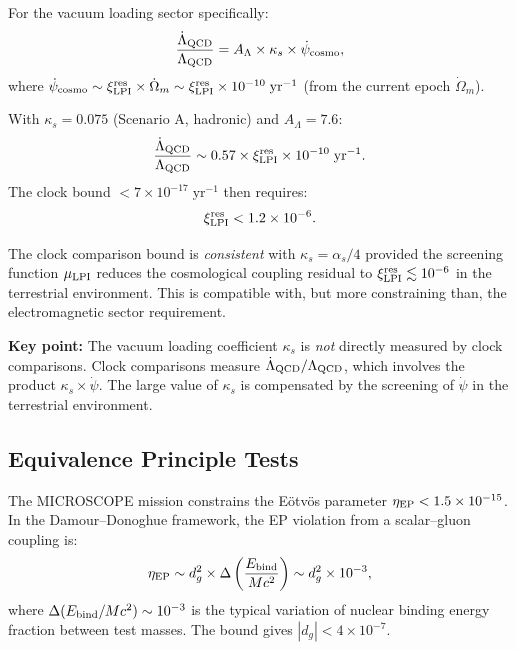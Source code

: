 \documentclass[11pt,letterpaper]{article}
\theoremstyle{definition}
\begin{document}
For the vacuum loading sector specifically:
\begin{equation}
\frac{\dot{\Lambda}_{\rm QCD}}{\Lambda_{\rm QCD}}
= A_\Lambda \times \kappa_s \times \dot{\psi}_{\rm cosmo},
\end{equation}
where $\dot{\psi}_{\rm cosmo} \sim \xi_{\rm LPI}^{\rm res} \times
\dot{\Omega}_m \sim \xi_{\rm LPI}^{\rm res} \times 10^{-10}\;
\mathrm{yr}^{-1}$ (from the current epoch $\dot{\Omega}_m$).

With $\kappa_s = 0.075$ (Scenario A, hadronic) and $A_\Lambda = 7.6$:
\begin{equation}
\frac{\dot{\Lambda}_{\rm QCD}}{\Lambda_{\rm QCD}}
\sim 0.57 \times \xi_{\rm LPI}^{\rm res} \times 10^{-10}\;
\mathrm{yr}^{-1}.
\end{equation}
The clock bound $< 7 \times 10^{-17}\;\mathrm{yr}^{-1}$ then requires:
\begin{equation}
\xi_{\rm LPI}^{\rm res} < 1.2 \times 10^{-6}.
\end{equation}

\begin{tcolorbox}[colback=yellow!5!white, colframe=yellow!50!black,
title=Experimental Bound Assessment]
The clock comparison bound is \emph{consistent} with
$\kappa_s = \alpha_s/4$ provided the screening function
$\mu_{\rm LPI}$ reduces the cosmological coupling residual to
$\xi_{\rm LPI}^{\rm res} \lesssim 10^{-6}$ in the terrestrial
environment.  This is compatible with, but more constraining than,
the electromagnetic sector requirement.

\textbf{Key point:} The vacuum loading coefficient $\kappa_s$ is
\emph{not} directly measured by clock comparisons.  Clock comparisons
measure $\dot{\Lambda}_{\rm QCD}/\Lambda_{\rm QCD}$, which involves
the product $\kappa_s \times \dot{\psi}$.  The large value of
$\kappa_s$ is compensated by the screening of $\dot{\psi}$ in the
terrestrial environment.
\end{tcolorbox}

\subsection{Equivalence Principle Tests}

The MICROSCOPE mission constrains the E\"otv\"os parameter
$\eta_{\rm EP} < 1.5 \times 10^{-15}$.  In the Damour--Donoghue
framework, the EP violation from a scalar--gluon coupling is:
\begin{equation}
\eta_{\rm EP} \sim d_g^2 \times \Delta\left(\frac{E_{\rm bind}}{Mc^2}\right)
\sim d_g^2 \times 10^{-3},
\end{equation}
where $\Delta(E_{\rm bind}/Mc^2) \sim 10^{-3}$ is the typical
variation of nuclear binding energy fraction between test masses.
The bound gives $|d_g| < 4 \times 10^{-7}$.
\end{document}
